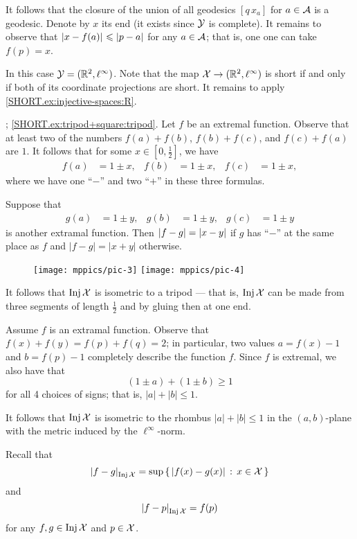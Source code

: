 It follows that the closure of the union of all geodesics $[q\,x_a]$ for $a\in\mathcal{A}$ is a geodesic.
Denote by $x$ its end (it exists since $\mathcal{Y}$ is complete).
It remains to observe that $\dist{x}{f(a)}{}\le \dist{p}{a}{}$ for any $a\in\mathcal{A}$;
that is, one one can take $f(p)=x$.

In this case $\mathcal{Y}=(\mathbb{R}^2,\ell^\infty)$.
Note that the map $\mathcal{X}\to (\mathbb{R}^2,\ell^\infty)$ is short if and only if both of its coordinate projections are short.
It remains to apply \ref{SHORT.ex:injective-spaces:R}.

; \ref{SHORT.ex:tripod+square:tripod}.
Let $f$ be an extremal function.
Observe that at least two of the numbers $f(a)+f(b)$, $f(b)+f(c)$, and $f(c)+f(a)$ are $1$.
It follows that for some $x\in[0,\tfrac12]$, we have 
\begin{align*}
f(a)&=1\pm x,&
f(b)&=1\pm x,&
f(c)&=1\pm x,
\end{align*}
where we have one ``$-$'' and two ``$+$'' in these three formulas.

Suppose that
\begin{align*}
g(a)&=1\pm y,& g(b)&=1\pm y,& g(c)&=1\pm y
\end{align*}
is another extramal function.
Then $|f-g|\z=|x-y|$ if $g$ has ``$-$'' at the same place as $f$ and $|f-g|=|x+y|$ otherwise.

\begin{wrapfigure}{o}{30 mm}
\vskip-0mm
\centering
\texttt{[image: mppics/pic-3]}
\bigskip
\texttt{[image: mppics/pic-4]}
\end{wrapfigure}

It follows that $\mathop{\rm Inj}\nolimits\mathcal{X}$ is isometric to a tripod --- that is, $\mathop{\rm Inj}\nolimits\mathcal{X}$ can be made from three segments of length $\tfrac12$ and by gluing then at one end.

Assume $f$ is an extramal function.
Observe that 
$f(x)+f(y)=f(p)+f(q)=2$;
in particular, two values $a=f(x)-1$ and $b=f(p)-1$ completely describe the function $f$.
Since $f$ is extremal, we also have that 
\[(1\pm a)+(1\pm b)\ge 1\]
for all 4 choices of signs;
that is, $|a|+|b|\le 1$.

It follows that $\mathop{\rm Inj}\nolimits\mathcal{X}$ is isometric to the rhombus $|a|+|b|\le 1$ in the $(a,b)$-plane with the metric induced by the $\ell^\infty$-norm.





Recall that 
\[\dist{f}{g}{\Inj\spc{X}}=\sup\set{|f(x)-g(x)|}{x\in\spc{X}}\]
and 
\[\dist{f}{p}{\Inj\spc{X}}=f(p)\]
for any $f,g\in \mathop{\rm Inj}\nolimits\mathcal{X}$ and $p\in \mathcal{X}$.

